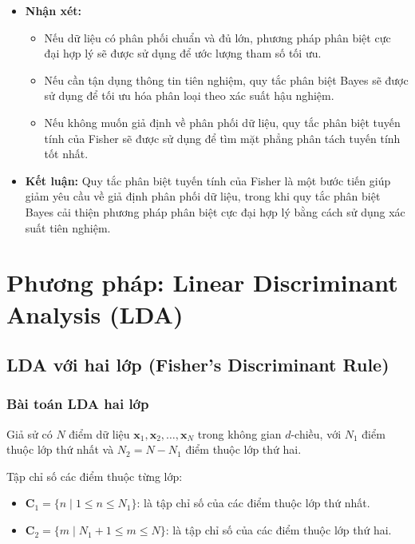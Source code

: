 \documentclass[
  a4paper,
]{article}
\providecommand{\tightlist}{%
  \setlength{\itemsep}{0pt}\setlength{\parskip}{0pt}}
\begin{document}
\begin{itemize}
\tightlist
\item
  \textbf{Nhận xét:}

  \begin{itemize}
  \tightlist
  \item
    Nếu dữ liệu có phân phối chuẩn và đủ lớn, phương pháp phân biệt cực
    đại hợp lý sẽ được sử dụng để ước lượng tham số tối ưu.
  \item
    Nếu cần tận dụng thông tin tiên nghiệm, quy tắc phân biệt Bayes sẽ
    được sử dụng để tối ưu hóa phân loại theo xác suất hậu nghiệm.
  \item
    Nếu không muốn giả định về phân phối dữ liệu, quy tắc phân biệt
    tuyến tính của Fisher sẽ được sử dụng để tìm mặt phẳng phân tách
    tuyến tính tốt nhất.
  \end{itemize}
\item
  \textbf{Kết luận:} Quy tắc phân biệt tuyến tính của Fisher là một bước
  tiến giúp giảm yêu cầu về giả định phân phối dữ liệu, trong khi quy
  tắc phân biệt Bayes cải thiện phương pháp phân biệt cực đại hợp lý
  bằng cách sử dụng xác suất tiên nghiệm.
\end{itemize}


\section{Phương pháp: Linear Discriminant Analysis
(LDA)}\label{phux1b0ux1a1ng-phuxe1p-linear-discriminant-analysis-lda}

\subsection{LDA với hai lớp (Fisher's Discriminant
Rule)}\label{lda-vux1edbi-hai-lux1edbp-fishers-discriminant-rule}

\subsubsection{Bài toán LDA hai
lớp}\label{buxe0i-touxe1n-lda-hai-lux1edbp}

Giả sử có \(N\) điểm dữ liệu
\(\mathbf{x}_1, \mathbf{x}_2, …, \mathbf{x}_N\) trong không gian
\(d\)-chiều, với \(N_1\) điểm thuộc lớp thứ nhất và \(N_2 = N - N_1\)
điểm thuộc lớp thứ hai.

Tập chỉ số các điểm thuộc từng lớp:

\begin{itemize}
\tightlist
\item
  \(\mathbf{C}_1 = \{ n \; | \; 1 \leq n \leq N_1 \}\): là tập chỉ số
  của các điểm thuộc lớp thứ nhất.
\item
  \(\mathbf{C}_2 = \{ m \; | \; N_1 + 1 \leq m \leq N \}\): là tập chỉ
  số của các điểm thuộc lớp thứ hai.
\end{itemize}
\end{document}
